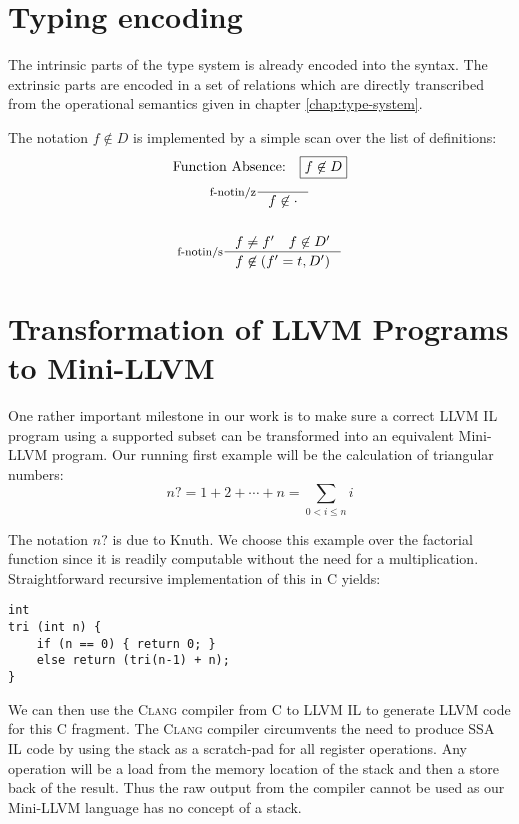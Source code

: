 \documentclass[a4paper, oneside, 10pt, draft]{memoir}
\newcommand{\clang}{\textsc{Clang}}
\begin{document}
\section{Typing encoding}

The intrinsic parts of the type system is already encoded into the
syntax. The extrinsic parts are encoded in a set of relations which are
directly transcribed from the operational semantics given in chapter
\ref{chap:type-system}.

The notation $f \not \in D$ is implemented by a simple scan over the
list of definitions:
\begin{gather*}
  \text{Function Absence:} \quad \boxed{f \not \in D}\\
  \inference[f-notin/z]{}{f \not \in \cdot}\\\\
  \inference[f-notin/s]{f \neq f' \quad f \not \in D'}{f \not \in (f' = t, D')}
\end{gather*}
\section{Transformation of LLVM Programs to Mini-LLVM}

One rather important milestone in our work is to make sure a correct
LLVM IL program using a supported subset can be transformed into an
equivalent Mini-LLVM program. Our running first example will be the
calculation of triangular numbers:
\begin{equation}
  \label{eq:1}
  n? = 1 + 2 + \dotsb + n = \sum_{0 < i \leq n} i
\end{equation}

The notation $n?$ is due to Knuth\cite[section
1.2.5]{knuth:1997:taocp1}. We choose this example over the factorial
function since it is readily computable without the need for a
multiplication. Straightforward recursive implementation of
this in C yields:
\begin{verbatim}
int
tri (int n) {
    if (n == 0) { return 0; }
    else return (tri(n-1) + n);
}
\end{verbatim}
We can then use the \clang{} compiler from C to LLVM IL to generate
LLVM code for this C fragment. The \clang{} compiler circumvents the
need to produce SSA IL code by using the stack as a scratch-pad for
all register operations. Any operation will be a load from the memory
location of the stack and then a store back of the result. Thus the
raw output from the compiler cannot be used as our Mini-LLVM language
has no concept of a stack.
\end{document}
